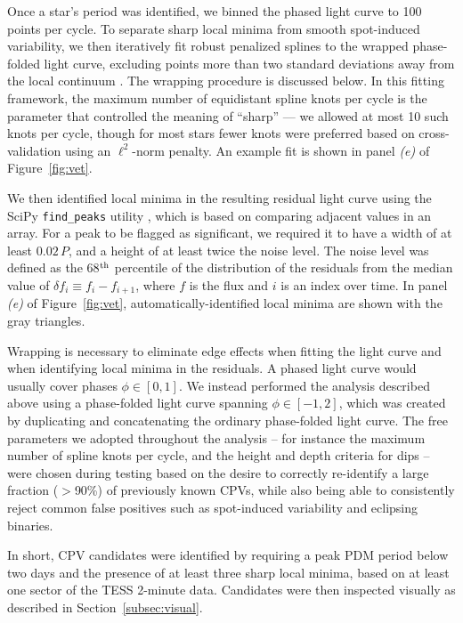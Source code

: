 \documentclass[11pt,twocolumn,tighten,linenumbers]{aastex63}
\begin{document}
Once a star's period was identified, we binned the phased light curve
to 100 points per cycle.  To separate sharp local minima from smooth
spot-induced variability, we then iteratively fit robust penalized
splines to the wrapped phase-folded light curve, excluding points more
than two standard deviations away from the local continuum
\citep{2019AJ....158..143H}.  The wrapping procedure is discussed
below.  In this fitting framework, the maximum number of equidistant
spline knots per cycle is the parameter that controlled the meaning of
``sharp'' --- we allowed at most 10 such knots per cycle, though for
most stars fewer knots were preferred based on cross-validation using
an $\ell^2$-norm penalty.  An example fit is shown in panel {\it (e)}
of Figure~\ref{fig:vet}.

We then identified local minima in the resulting residual light curve
using the SciPy \texttt{find\_peaks} utility
\citep{2020NatMe..17..261V}, which is based on comparing adjacent
values in an array.  For a peak to be flagged as significant, we
required it to have a width of at least $0.02\,P$, and a height of at
least twice the noise level.  The noise level was defined as the
68$^{\rm th}$ percentile of the distribution of the residuals from the
median value of $\delta f_i \equiv f_i - f_{i+1}$, where $f$ is the
flux and $i$ is an index over time.  In panel {\it (e)} of
Figure~\ref{fig:vet}, automatically-identified local minima are shown
with the gray triangles.

Wrapping is necessary to eliminate edge effects when fitting the light
curve and when identifying local minima in the residuals.  A phased
light curve would usually cover phases $\phi \in [ 0,1 ]$.  We instead
performed the analysis described above using a phase-folded light
curve spanning $\phi \in [-1,2 ]$, which was created by duplicating
and concatenating the ordinary phase-folded light curve.  The free
parameters we adopted throughout the analysis -- for instance the
maximum number of spline knots per cycle, and the height and depth
criteria for dips -- were chosen during testing based on the desire to
correctly re-identify a large fraction ($>$90\%) of previously known
CPVs, while also being able to consistently reject common false
positives such as spot-induced variability and eclipsing binaries.

In short, CPV candidates were identified by requiring a peak PDM
period below two days and the presence of at least three sharp local
minima, based on at least one sector of the TESS 2-minute data.
Candidates were then inspected visually as described in
Section~\ref{subsec:visual}.
\end{document}
